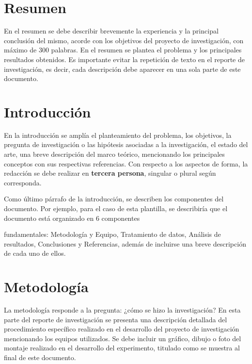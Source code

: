 \documentclass[11pt]{article}
\begin{document}
	\vspace*{-0.6 cm} %
	
	\section*{Resumen}
	\vspace*{-0.4 cm} 
	En el resumen se debe describir brevemente la experiencia y la principal conclusión del mismo, acorde con los objetivos del proyecto de investigación, con máximo de 300 palabras.  En el resumen se plantea el problema y los principales resultados obtenidos.  Es importante evitar la repetición de texto en el reporte de investigación, es decir, cada descripción debe aparecer en una sola parte de este documento.
	\vspace*{-0.6 cm} 
	\section*{Introducción}
	\vspace*{-0.4 cm} 
	En la introducción se amplía el planteamiento del problema, los objetivos, la pregunta de investigación o las hipótesis asociadas a la investigación, el estado del arte, una breve descripción del marco teórico, mencionando los principales conceptos con sus respectivas referencias.  Con respecto a los aspectos de forma, la redacción se debe realizar en \textbf{tercera persona}, singular o plural según corresponda.
	
	Como último párrafo de la introducción, se describen los componentes del documento.  Por ejemplo, para el caso de esta plantilla, se describiría que el documento está organizado en 6 componentes
	
	\newpage %
	
	\vspace*{0.5cm} %
	
	fundamentales: Metodología y Equipo, Tratamiento de datos, Análisis de resultados, Conclusiones y Referencias, además de incluirse una breve descripción de cada uno de ellos.
	
	\vspace*{-0.72cm} %
	\section*{Metodología}
	\vspace*{-0.35cm} %
	La metodología responde a la pregunta: ¿cómo se hizo la investigación?  En esta parte del reporte de investigación se presenta una descripción detallada del procedimiento específico realizado en el desarrollo del proyecto de investigación mencionando los equipos utilizados. Se debe incluir un gráfico, dibujo o foto del montaje realizado en el desarrollo del experimento, titulado como se muestra al final de este documento.
	
\end{document}
